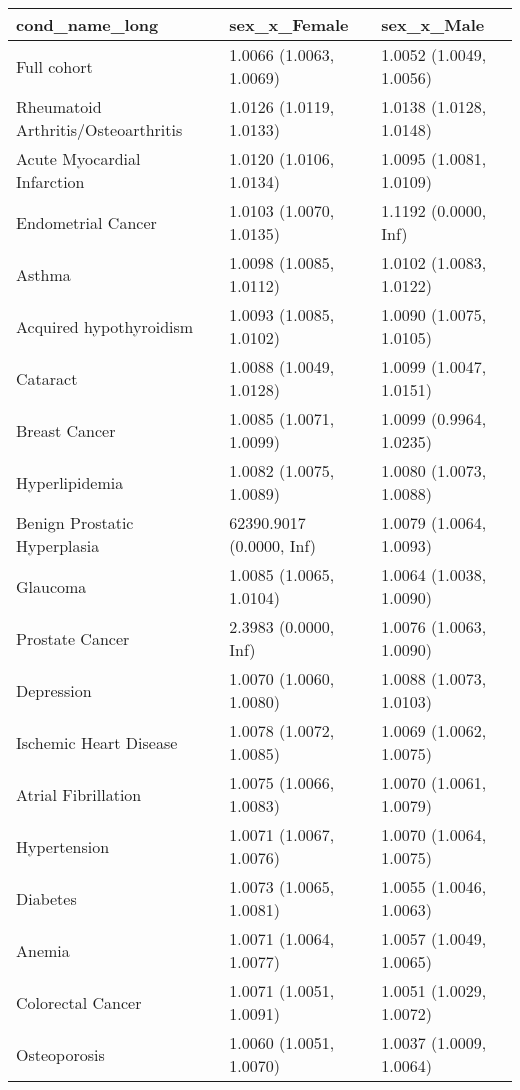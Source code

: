 \begin{table}[ht]
\centering
\begin{tabular}{lll}
  \hline
cond_name_long & sex_x_Female & sex_x_Male \\ 
  \hline
Full cohort & 1.0066 (1.0063, 1.0069) & 1.0052 (1.0049, 1.0056) \\ 
  Rheumatoid Arthritis/Osteoarthritis & 1.0126 (1.0119, 1.0133) & 1.0138 (1.0128, 1.0148) \\ 
  Acute Myocardial Infarction & 1.0120 (1.0106, 1.0134) & 1.0095 (1.0081, 1.0109) \\ 
  Endometrial Cancer & 1.0103 (1.0070, 1.0135) & 1.1192 (0.0000,   Inf) \\ 
  Asthma & 1.0098 (1.0085, 1.0112) & 1.0102 (1.0083, 1.0122) \\ 
  Acquired hypothyroidism & 1.0093 (1.0085, 1.0102) & 1.0090 (1.0075, 1.0105) \\ 
  Cataract & 1.0088 (1.0049, 1.0128) & 1.0099 (1.0047, 1.0151) \\ 
  Breast Cancer & 1.0085 (1.0071, 1.0099) & 1.0099 (0.9964, 1.0235) \\ 
  Hyperlipidemia & 1.0082 (1.0075, 1.0089) & 1.0080 (1.0073, 1.0088) \\ 
  Benign Prostatic Hyperplasia & 62390.9017 (0.0000,   Inf) & 1.0079 (1.0064, 1.0093) \\ 
  Glaucoma & 1.0085 (1.0065, 1.0104) & 1.0064 (1.0038, 1.0090) \\ 
  Prostate Cancer & 2.3983 (0.0000,   Inf) & 1.0076 (1.0063, 1.0090) \\ 
  Depression & 1.0070 (1.0060, 1.0080) & 1.0088 (1.0073, 1.0103) \\ 
  Ischemic Heart Disease & 1.0078 (1.0072, 1.0085) & 1.0069 (1.0062, 1.0075) \\ 
  Atrial Fibrillation & 1.0075 (1.0066, 1.0083) & 1.0070 (1.0061, 1.0079) \\ 
  Hypertension & 1.0071 (1.0067, 1.0076) & 1.0070 (1.0064, 1.0075) \\ 
  Diabetes & 1.0073 (1.0065, 1.0081) & 1.0055 (1.0046, 1.0063) \\ 
  Anemia & 1.0071 (1.0064, 1.0077) & 1.0057 (1.0049, 1.0065) \\ 
  Colorectal Cancer & 1.0071 (1.0051, 1.0091) & 1.0051 (1.0029, 1.0072) \\ 
  Osteoporosis & 1.0060 (1.0051, 1.0070) & 1.0037 (1.0009, 1.0064) \\ 

\end{tabular}
\end{table}
